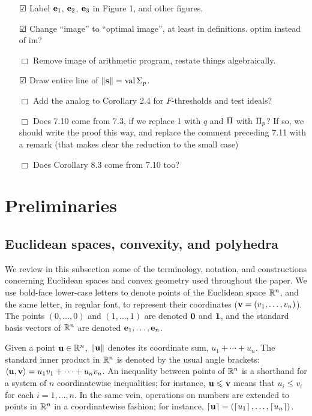 \documentclass[11pt]{amsart}
\begin{document}
{\begin{itemize}
      \item[$\CheckedBox$] Label $\mathbf{e}_1$, $\mathbf{e}_2$, $\mathbf{e}_3$ in Figure 1, and other figures.
      \item[$\CheckedBox$] Change ``image'' to ``optimal image'', at least in definitions. optim instead of im?
      \item[$\Box$] Remove image of arithmetic program, restate things algebraically.
      \item[$\CheckedBox$] Draw entire line of $\| \mathbf{s} \| = \operatorname{val} \Sigma_p$.
      \item[$\Box$] Add the analog to Corollary 2.4 for $F$-thresholds and test ideals?
      \item[$\Box$] Does 7.10 come from 7.3, if we replace 1 with $q$ and $\Pi$ with $\Pi_p$? If so, we should write the proof this way, and replace the comment preceding 7.11 with a remark (that makes clear the reduction to the small case)
      \item[$\Box$] Does Corollary 8.3 come from 7.10 too?
   \end{itemize}
}

\newpage
\section{Preliminaries}

\subsection{Euclidean spaces, convexity, and polyhedra}
\label{ss: euclidean spaces and convexity}

We review in this subsection some of the terminology, notation, and constructions concerning Euclidean spaces and convex geometry used throughout the paper.
We use bold-face lower-case letters to denote points of the Euclidean space $\mathbb{R}^n$, and the same letter, in regular font, to represent their coordinates (\eg $\mathbf{v}=(v_1,\ldots,v_n)$).
The points $(0,\ldots,0)$ and $(1,\ldots,1)$ are denoted $\mathbf{0}$ and $\mathbf{1}$, and the standard basis vectors of $\mathbb{R}^n$ are denoted $\mathbf{e}_1,\ldots,\mathbf{e}_n$.

Given a point $\mathbf{u}\in \mathbb{R}^n$, $\| \mathbf{u} \|$ denotes its coordinate sum, $u_1+\cdots+u_n$.
The standard inner product in $\mathbb{R}^n$ is denoted by the usual angle brackets: $\langle \mathbf{u}, \mathbf{v} \rangle = u_1v_1 + \cdots + u_nv_n$.
An inequality between points of $\mathbb{R}^n$ is a shorthand for a system of $n$ coordinatewise inequalities; for instance, $\mathbf{u}\leqslant \mathbf{v}$ means that $u_i \le v_i$ for each $i=1,\ldots,n$.
In the same vein, operations on numbers are extended to points in $\mathbb{R}^n$ in a coordinatewise fashion; for instance, $\left\lceil \mathbf{u} \right\rceil=(\left\lceil u_1 \right\rceil,\ldots,\left\lceil u_n \right\rceil)$.
\end{document}
